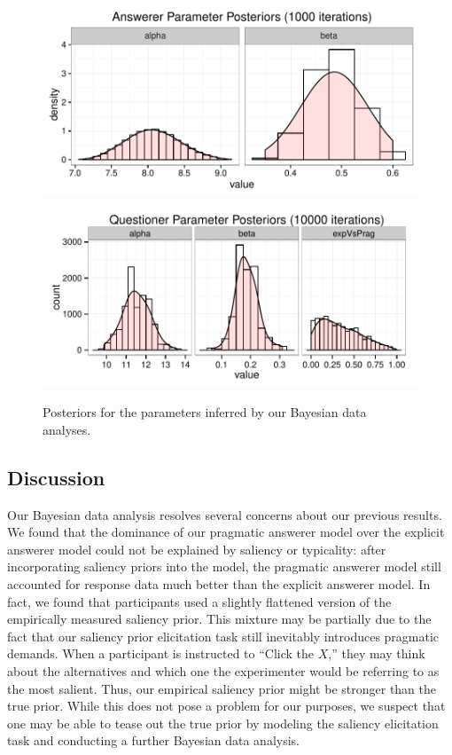 \documentclass[12pt, floatsintext, jou]{apa6}
\begin{document}
\begin{figure}[t!]
\begin{center}
\includegraphics[scale=1]{AnswererParamPosteriors.pdf}
\includegraphics[scale=1]{QuestionerParamPosteriors.pdf}
\end{center}
\caption{Posteriors for the parameters inferred by our Bayesian data analyses. }
\label{fig:BayesianParamPosteriors}
\end{figure}
\subsection{Discussion}

Our Bayesian data analysis resolves several concerns about our previous results. We found that the dominance of our pragmatic answerer model over the explicit answerer model could not be explained by saliency or typicality: after incorporating saliency priors into the model, the pragmatic answerer model still accounted for response data much better than the explicit answerer model. In fact, we found that participants used a slightly flattened version of the empirically measured saliency prior. This mixture may be partially due to the fact that our saliency prior elicitation task still inevitably introduces pragmatic demands. When a participant is instructed to ``Click the $X$,'' they may think about the alternatives and which one the experimenter would be referring to as the most salient. Thus, our empirical saliency prior might be stronger than the true prior. While this does not pose a problem for our purposes, we suspect that one may be able to tease out the true prior by modeling the saliency elicitation task and conducting a further Bayesian data analysis.
\end{document}
